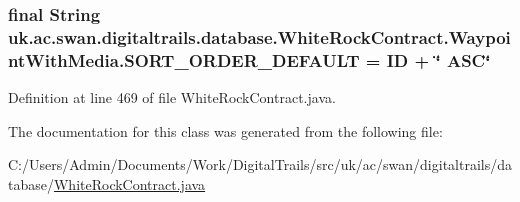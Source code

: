 \hypertarget{classuk_1_1ac_1_1swan_1_1digitaltrails_1_1database_1_1_white_rock_contract_1_1_waypoint_with_media_ab6e8d039d1cb0db6a69540e626806ba6}{
\subsubsection[{S\+O\+R\+T\+\_\+\+O\+R\+D\+E\+R\+\_\+\+D\+E\+F\+A\+U\+L\+T}]{\setlength{\rightskip}{0pt plus 5cm}final String uk.\+ac.\+swan.\+digitaltrails.\+database.\+White\+Rock\+Contract.\+Waypoint\+With\+Media.\+S\+O\+R\+T\+\_\+\+O\+R\+D\+E\+R\+\_\+\+D\+E\+F\+A\+U\+L\+T = I\+D + \char`\"{} A\+S\+C\char`\"{}\hspace{0.3cm}{\ttfamily [static]}}}\label{classuk_1_1ac_1_1swan_1_1digitaltrails_1_1database_1_1_white_rock_contract_1_1_waypoint_with_media_ab6e8d039d1cb0db6a69540e626806ba6}


Definition at line 469 of file White\+Rock\+Contract.\+java.



The documentation for this class was generated from the following file\+:\begin{DoxyCompactItemize}
\item 
C\+:/\+Users/\+Admin/\+Documents/\+Work/\+Digital\+Trails/src/uk/ac/swan/digitaltrails/database/\hyperlink{_white_rock_contract_8java}{White\+Rock\+Contract.\+java}\end{DoxyCompactItemize}

